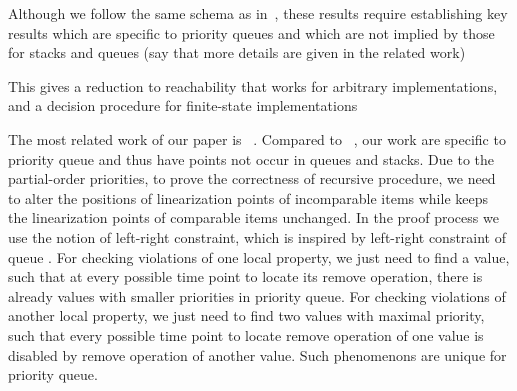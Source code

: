 Although we follow the same schema as in~\cite{DBLP:conf/icalp/BouajjaniEEH15}, these results require establishing key results which are specific to priority queues and which are not implied by those for stacks and queues (say that more details are given in the related work)

This gives a reduction to reachability that works for arbitrary implementations, and a decision procedure for finite-state implementations




\smallskip

\noindent The most related work of our paper is ~\cite{DBLP:conf/icalp/BouajjaniEEH15}. Compared to ~\cite{DBLP:conf/icalp/BouajjaniEEH15}, our work are specific to priority queue and thus have points not occur in queues and stacks. Due to the partial-order priorities, to prove the correctness of recursive procedure, we need to alter the positions of linearization points of incomparable items while keeps the linearization points of comparable items unchanged. {\color {blue}In the proof process we use the notion of left-right constraint, which is inspired by left-right constraint of queue \cite{Bouajjani:2015}.} For checking violations of one local property, we just need to find a value, such that at every possible time point to locate its remove operation, there is already values with smaller priorities in priority queue. For checking violations of another local property, we just need to find two values with maximal priority, such that every possible time point to locate remove operation of one value is disabled by remove operation of another value. Such phenomenons are unique for priority queue.



